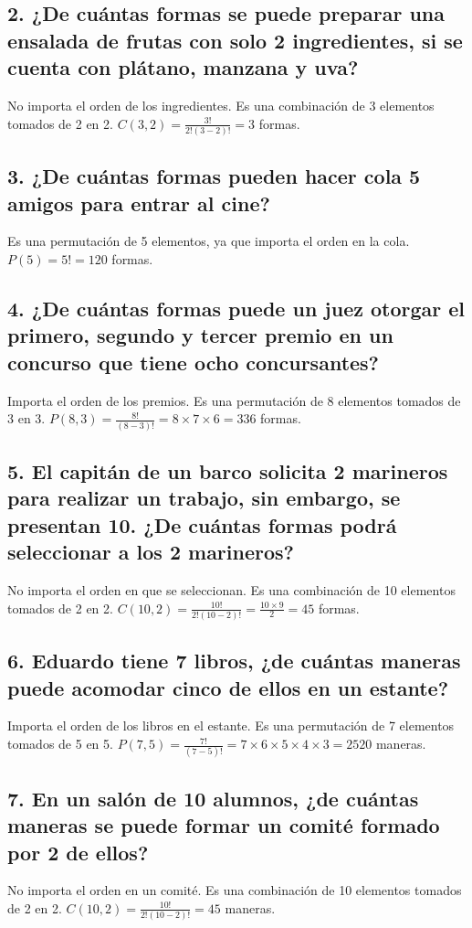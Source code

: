 \documentclass[11pt]{article}
\begin{document}
    \subsection*{2. ¿De cuántas formas se puede preparar una ensalada de frutas con solo 2 ingredientes, si se cuenta con plátano, manzana y uva?}
    No importa el orden de los ingredientes. Es una combinación de 3 elementos tomados de 2 en 2. $C(3,2) = \frac{3!}{2!(3-2)!} = 3$ formas.

    \subsection*{3. ¿De cuántas formas pueden hacer cola 5 amigos para entrar al cine?}
    Es una permutación de 5 elementos, ya que importa el orden en la cola. $P(5) = 5! = 120$ formas.

    \subsection*{4. ¿De cuántas formas puede un juez otorgar el primero, segundo y tercer premio en un concurso que tiene ocho concursantes?}
    Importa el orden de los premios. Es una permutación de 8 elementos tomados de 3 en 3. $P(8,3) = \frac{8!}{(8-3)!} = 8 \times 7 \times 6 = 336$ formas.

    \subsection*{5. El capitán de un barco solicita 2 marineros para realizar un trabajo, sin embargo, se presentan 10. ¿De cuántas formas podrá seleccionar a los 2 marineros?}
    No importa el orden en que se seleccionan. Es una combinación de 10 elementos tomados de 2 en 2. $C(10,2) = \frac{10!}{2!(10-2)!} = \frac{10 \times 9}{2} = 45$ formas.

    \subsection*{6. Eduardo tiene 7 libros, ¿de cuántas maneras puede acomodar cinco de ellos en un estante?}
    Importa el orden de los libros en el estante. Es una permutación de 7 elementos tomados de 5 en 5. $P(7,5) = \frac{7!}{(7-5)!} = 7 \times 6 \times 5 \times 4 \times 3 = 2520$ maneras.

    \subsection*{7. En un salón de 10 alumnos, ¿de cuántas maneras se puede formar un comité formado por 2 de ellos?}
    No importa el orden en un comité. Es una combinación de 10 elementos tomados de 2 en 2. $C(10,2) = \frac{10!}{2!(10-2)!} = 45$ maneras.
\end{document}
